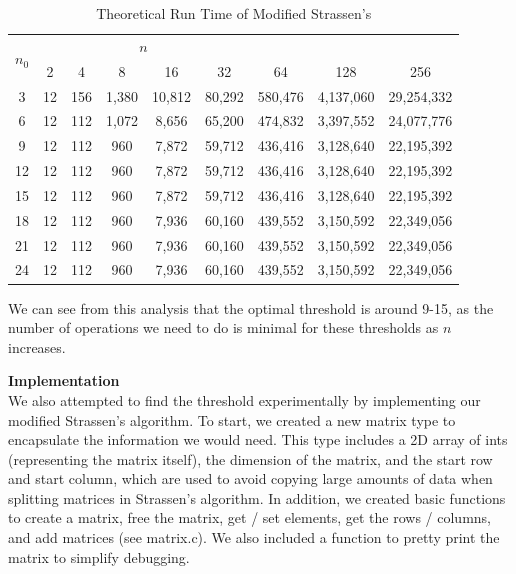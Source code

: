 \documentclass[12pt]{article}
\begin{document}
\begin{table}[h!]
\centering
\renewcommand{\arraystretch}{1.2}
{\setlength{\tabcolsep}{5pt}
\begin{tabular}{c|c|c|c|c|c|c|c|c}
\multirow{2}{*}{$n_0$} & \multicolumn{5}{c}{$n$}\\ \cline{2-9}
& 2 & 4 & 8 & 16 & 32 & 64 & 128 & 256 \\ \hline
3 & \cellcolor{green}12 & 156 & 1,380 & 10,812 & 80,292 & 580,476 & 4,137,060 & 29,254,332 \\
6 & \cellcolor{green}12 & \cellcolor{green}112 & 1,072 & 8,656 & 65,200 & 474,832 & 3,397,552 & 24,077,776 \\
9 & \cellcolor{green}12 & \cellcolor{green}112 & \cellcolor{green}960 & \cellcolor{green}7,872 & \cellcolor{green}59,712 & \cellcolor{green}436,416 & \cellcolor{green}3,128,640 & \cellcolor{green}22,195,392 \\
12 & \cellcolor{green}12 & \cellcolor{green}112 & \cellcolor{green}960 & \cellcolor{green}7,872 & \cellcolor{green}59,712 & \cellcolor{green}436,416 & \cellcolor{green}3,128,640 & \cellcolor{green}22,195,392 \\
15 & \cellcolor{green}12 & \cellcolor{green}112 & \cellcolor{green}960 & \cellcolor{green}7,872 & \cellcolor{green}59,712 & \cellcolor{green}436,416 & \cellcolor{green}3,128,640 & \cellcolor{green}22,195,392 \\
18 & \cellcolor{green}12 & \cellcolor{green}112 & \cellcolor{green}960 & 7,936 & 60,160 & 439,552 & 3,150,592 & 22,349,056 \\
21 & \cellcolor{green}12 & \cellcolor{green}112 & \cellcolor{green}960 & 7,936 & 60,160 & 439,552 & 3,150,592 & 22,349,056 \\
24 & \cellcolor{green}12 & \cellcolor{green}112 & \cellcolor{green}960 & 7,936 & 60,160 & 439,552 & 3,150,592 & 22,349,056 \\
\end{tabular}}
\caption{Theoretical Run Time of Modified Strassen's}
\end{table}

We can see from this analysis that the optimal threshold is around 9-15, as the number of operations we need to do is minimal for these thresholds as $n$ increases. \\

\bigskip

\pagebreak

\textbf{Implementation} \\
We also attempted to find the threshold experimentally by implementing our modified Strassen's algorithm. To start, we created a new matrix type to encapsulate the information we would need. This type includes a 2D array of ints (representing the matrix itself), the dimension of the matrix, and the start row and start column, which are used to avoid copying large amounts of data when splitting matrices in Strassen's algorithm. In addition, we created basic functions to create a matrix, free the matrix, get / set elements, get the rows / columns, and add matrices (see matrix.c). We also included a function to pretty print the matrix to simplify debugging. \\
\end{document}
